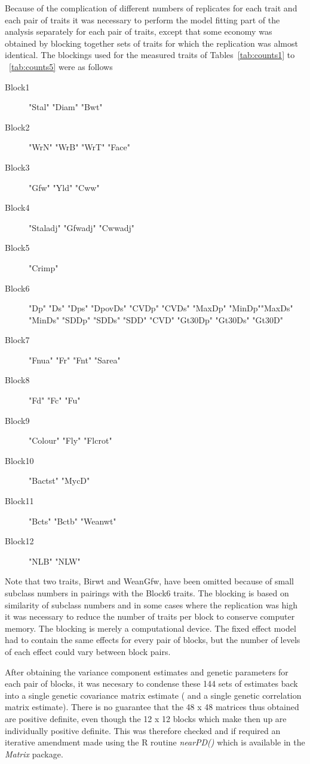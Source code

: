 \documentclass[titlepage]{article}  %
\begin{document}
Because of the complication of different numbers of replicates for each trait and each pair of traits it was necessary to perform the model fitting part of the analysis separately for each pair of traits, except that some economy was obtained by blocking together sets of traits for which the replication was almost identical. The blockings used for the measured traits of Tables~\ref{tab:counts1} to ~\ref{tab:counts5} were as follows
\begin{description}
\item[Block1] "Stal" "Diam" "Bwt"
\item[Block2] "WrN"  "WrB"  "WrT"  "Face"
\item[Block3] "Gfw" "Yld" "Cww"
\item[Block4] "Staladj" "Gfwadj"  "Cwwadj"
\item[Block5] "Crimp"
\item[Block6] "Dp"     "Ds"     "Dps"    "DpovDs" "CVDp"   "CVDs"   "MaxDp"  "MinDp""MaxDs"  "MinDs"  "SDDp"   "SDDs"   "SDD"    "CVD"    "Gt30Dp" "Gt30Ds" "Gt30D"
\item[Block7] "Fnua"  "Fr"    "Fnt"   "Sarea"
\item[Block8] "Fd" "Fc" "Fu"
\item[Block9] "Colour" "Fly"    "Flcrot"
\item[Block10] "Bactst" "MycD"
\item[Block11] "Bcts"   "Bctb"   "Weanwt"
\item[Block12] "NLB" "NLW" 
\end{description} 
Note that two traits, Birwt and WeanGfw, have been omitted because of small subclass numbers in pairings with the Block6 traits. The blocking is based on similarity of subclass numbers and in some cases where the replication was high it was necessary to reduce the number of traits per block to conserve computer memory. The blocking is merely a computational device. The fixed effect model had to contain the same effects for every pair of blocks, but the number of levels of each effect could vary between block pairs.

After obtaining the variance component estimates and genetic parameters for each pair of blocks, it was necesary to condense these 144 sets of estimates back into a single genetic covariance matrix estimate ( and a single genetic correlation matrix estimate). There is no guarantee that the 48 x 48 matrices thus obtained are positive definite, even though the 12 x 12 blocks which make then up are individually positive definite. This was therefore checked and if required an iterative amendment made using the R routine {\em nearPD()} which is available in the {\em Matrix} package.
\end{document}
